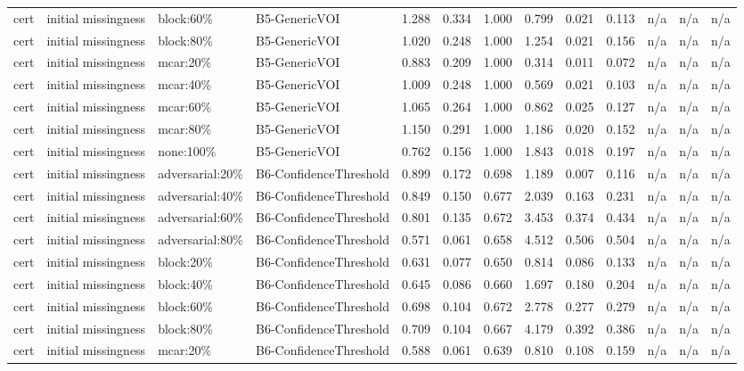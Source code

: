 \begin{table}[!ht]
{\begin{tabular}{lllllllllllll}
cert & initial missingness & block:60\% & B5-GenericVOI & 1.288 & 0.334 & 1.000 & 0.799 & 0.021 & 0.113 & n/a & n/a & n/a \\
cert & initial missingness & block:80\% & B5-GenericVOI & 1.020 & 0.248 & 1.000 & 1.254 & 0.021 & 0.156 & n/a & n/a & n/a \\
cert & initial missingness & mcar:20\% & B5-GenericVOI & 0.883 & 0.209 & 1.000 & 0.314 & 0.011 & 0.072 & n/a & n/a & n/a \\
cert & initial missingness & mcar:40\% & B5-GenericVOI & 1.009 & 0.248 & 1.000 & 0.569 & 0.021 & 0.103 & n/a & n/a & n/a \\
cert & initial missingness & mcar:60\% & B5-GenericVOI & 1.065 & 0.264 & 1.000 & 0.862 & 0.025 & 0.127 & n/a & n/a & n/a \\
cert & initial missingness & mcar:80\% & B5-GenericVOI & 1.150 & 0.291 & 1.000 & 1.186 & 0.020 & 0.152 & n/a & n/a & n/a \\
cert & initial missingness & none:100\% & B5-GenericVOI & 0.762 & 0.156 & 1.000 & 1.843 & 0.018 & 0.197 & n/a & n/a & n/a \\
cert & initial missingness & adversarial:20\% & B6-ConfidenceThreshold & 0.899 & 0.172 & 0.698 & 1.189 & 0.007 & 0.116 & n/a & n/a & n/a \\
cert & initial missingness & adversarial:40\% & B6-ConfidenceThreshold & 0.849 & 0.150 & 0.677 & 2.039 & 0.163 & 0.231 & n/a & n/a & n/a \\
cert & initial missingness & adversarial:60\% & B6-ConfidenceThreshold & 0.801 & 0.135 & 0.672 & 3.453 & 0.374 & 0.434 & n/a & n/a & n/a \\
cert & initial missingness & adversarial:80\% & B6-ConfidenceThreshold & 0.571 & 0.061 & 0.658 & 4.512 & 0.506 & 0.504 & n/a & n/a & n/a \\
cert & initial missingness & block:20\% & B6-ConfidenceThreshold & 0.631 & 0.077 & 0.650 & 0.814 & 0.086 & 0.133 & n/a & n/a & n/a \\
cert & initial missingness & block:40\% & B6-ConfidenceThreshold & 0.645 & 0.086 & 0.660 & 1.697 & 0.180 & 0.204 & n/a & n/a & n/a \\
cert & initial missingness & block:60\% & B6-ConfidenceThreshold & 0.698 & 0.104 & 0.672 & 2.778 & 0.277 & 0.279 & n/a & n/a & n/a \\
cert & initial missingness & block:80\% & B6-ConfidenceThreshold & 0.709 & 0.104 & 0.667 & 4.179 & 0.392 & 0.386 & n/a & n/a & n/a \\
cert & initial missingness & mcar:20\% & B6-ConfidenceThreshold & 0.588 & 0.061 & 0.639 & 0.810 & 0.108 & 0.159 & n/a & n/a & n/a \\

\end{tabular}}
\end{table}
